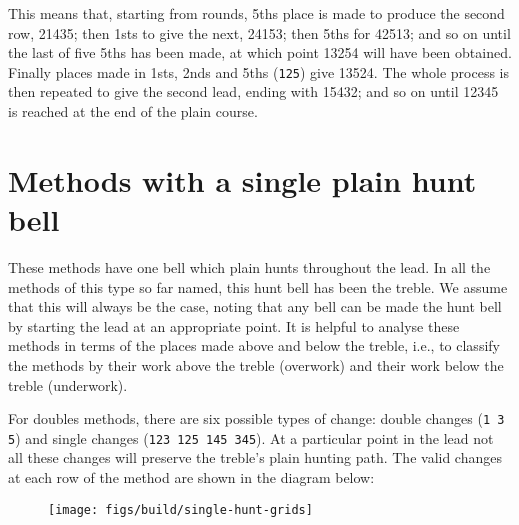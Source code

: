 This means that, starting from rounds,
5ths place is made to produce the second row, 21435;
then 1sts to give the next, 24153;
then 5ths for 42513;
and so on until the last of five 5ths has been made,
at which point 13254 will have been obtained.
Finally places made in 1sts, 2nds and 5ths ({\tt 125}) give 13524.
The whole process is then repeated to give the second lead, ending with 15432;
and so on until 12345 is reached at the end of the plain course.

\section{Methods with a single plain hunt bell} \label{sec:intro-single-hunt}

These methods have one bell which plain hunts throughout the lead.
In all the methods of this type so far named,
this hunt bell has been the treble.
We assume that this will always be the case, noting that any bell can be made
the hunt bell by starting the lead at an appropriate point.
It is helpful to analyse these methods in terms of the places made above and
below the treble,
i.e., to classify the methods by their work above the treble (overwork) and
their work below the treble (underwork).

For doubles methods, there are six possible types of change:
double changes ({\tt 1 3 5}) and single changes ({\tt 123 125 145 345}).
At a particular point in the lead not all these changes will preserve the
treble's plain hunting path.
The valid changes at each row of the method are shown in the diagram below:

\begin{figure}[htbp]
  \centering
  \texttt{[image: figs/build/single-hunt-grids]}
\end{figure}


